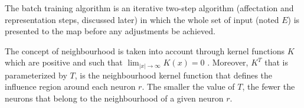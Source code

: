 \documentclass[10pt, conference, compsocconf]{IEEEtran}
\begin{document}
The batch training algorithm is an iterative two-step algorithm (affectation and representation steps, discussed later) in which the whole set of input (noted $E$) is presented to the map before any adjustments be achieved. %


The concept of neighbourhood is taken into account through kernel functions $K$ which are positive and such that $\lim_{|x| \to \infty} K(x) = 0$ \cite{Badran:2005}. Moreover, $K^T$ that is parameterized by $T$, is the neighbourhood kernel function that defines the influence region around each neuron $r$. The smaller the value of $T$, the fewer the neurons that belong to the neighbourhood of a given neuron $r$.



%




\end{document}
